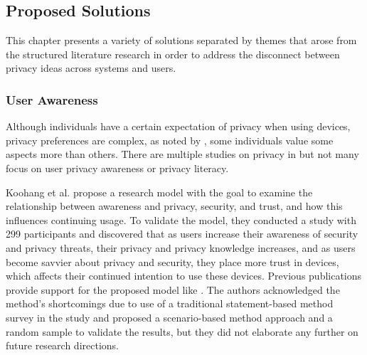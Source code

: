 \subsection{Proposed Solutions}

\par This chapter presents a variety of solutions separated by themes that arose
from the structured literature research in order to address the disconnect
between privacy ideas across systems and users.

\subsubsection{User Awareness}

Although individuals have a certain expectation of privacy when using \hyperlink{\acronym}{\acronym}
devices, privacy preferences are complex, as noted by \cite{naeini2017privacy},
some individuals value some aspects more than others. There are multiple studies
on privacy in \hyperlink{\acronym}{\acronym} but not many focus on user privacy awareness or
privacy literacy.

Koohang et al. \cite{koohang2022internet} propose a research model with
the goal to examine the relationship between \hyperlink{\acronym}{\acronym} awareness and \hyperlink{\acronym}{\acronym} privacy,
security, and trust, and how this influences \hyperlink{\acronym}{\acronym} continuing usage. To validate
the model, they conducted a study with 299 participants and discovered that
as users increase their awareness of \hyperlink{\acronym}{\acronym} security and privacy threats, their
privacy and privacy knowledge increases, and as users become savvier about
\hyperlink{\acronym}{\acronym} privacy and security, they place more trust in \hyperlink{\acronym}{\acronym} devices, which affects
their continued intention to use these \hyperlink{\acronym}{\acronym} devices. Previous publications
provide support for the proposed model like \cite{tsourela2020internet, knijnenburg2022modern}.
The authors acknowledged the method's shortcomings due to use of a traditional
statement-based method survey in the study and proposed a scenario-based
method approach and a random sample to validate the results, but they did
not elaborate any further on future research directions.

